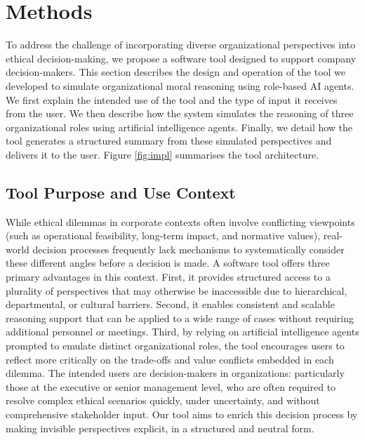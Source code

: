 \section{Methods}
\label{sec:methods}

To address the challenge of incorporating diverse organizational perspectives into ethical decision-making, we propose a software tool designed to support company decision-makers.
This section describes the design and operation of the tool we developed to simulate organizational moral reasoning using role-based AI agents.
We first explain the intended use of the tool and the type of input it receives from the user. We then describe how the system simulates the reasoning of three organizational roles using artificial intelligence agents. Finally, we detail how the tool generates a structured summary from these simulated perspectives and delivers it to the user.
Figure \ref{fig:impl} summarises the tool architecture.

\subsection{Tool Purpose and Use Context}

While ethical dilemmas in corporate contexts often involve conflicting viewpoints (such as operational feasibility, long-term impact, and normative values), real-world decision processes frequently lack mechanisms to systematically consider these different angles before a decision is made.
A software tool offers three primary advantages in this context. First, it provides structured access to a plurality of perspectives that may otherwise be inaccessible due to hierarchical, departmental, or cultural barriers. Second, it enables consistent and scalable reasoning support that can be applied to a wide range of cases without requiring additional personnel or meetings. Third, by relying on artificial intelligence agents prompted to emulate distinct organizational roles, the tool encourages users to reflect more critically on the trade-offs and value conflicts embedded in each dilemma.
The intended users are decision-makers in organizations: particularly those at the executive or senior management level, who are often required to resolve complex ethical scenarios quickly, under uncertainty, and without comprehensive stakeholder input. Our tool aims to enrich this decision process by making invisible perspectives explicit, in a structured and neutral form.

